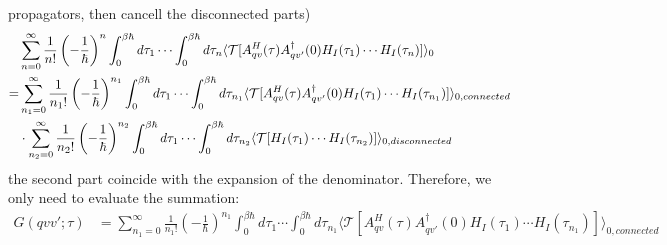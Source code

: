 \documentclass{article}
\begin{document}
propagators, then cancell the disconnected parts)
\begin{align}
    &\sum_{n=0}^{\infty} \frac{1}{n!} \left( -\frac{1}{\hbar} \right)^n 
    \int_0^{\beta\hbar} d\tau_1 \cdots \int_0^{\beta\hbar} d\tau_n \langle \mathcal{T}[ A^H_{qv}(\tau) A_{qv'}^{\dagger}(0) H_I(\tau_1) \cdots H_I(\tau_n) ] \rangle_0  \notag \\
      = &\sum_{n_1=0}^{\infty} \frac{1}{n_1!} \left( -\frac{1}{\hbar} \right)^{n_1} 
      \int_0^{\beta\hbar} d\tau_1 \cdots \int_0^{\beta\hbar} d\tau_{n_1} \langle \mathcal{T}[ A^H_{qv}(\tau) A_{qv'}^{\dagger}(0) H_I(\tau_1) \cdots H_I(\tau_{n_1}) ]\rangle_{0,connected} \notag \\
      & \cdot \sum_{n_2=0}^{\infty} \frac{1}{n_2!} \left( -\frac{1}{\hbar} \right)^{n_2} 
      \int_0^{\beta\hbar} d\tau_1 \cdots \int_0^{\beta\hbar} d\tau_{n_2} \langle \mathcal{T}[ H_I(\tau_1) \cdots H_I(\tau_{n_2}) ] \rangle_{0,disconnected}
\end{align}
the second part coincide with the expansion of the denominator. Therefore, we only need to evaluate the summation:
\begin{align}
    G(qvv';\tau)&= \sum_{n_1=0}^{\infty} \frac{1}{n_1!} \left( -\frac{1}{\hbar} \right)^{n_1} 
    \int_0^{\beta\hbar} d\tau_1 \cdots \int_0^{\beta\hbar} d\tau_{n_1} \langle \mathcal{T}[ A^H_{qv}(\tau) A_{qv'}^{\dagger}(0) H_I(\tau_1) \cdots H_I(\tau_{n_1}) ]\rangle_{0,connected}
\end{align}
\end{document}
